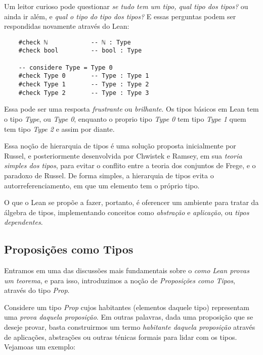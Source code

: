 Um leitor curioso pode questionar \textit{se tudo tem um tipo, qual tipo dos tipos?} ou ainda ir além, e \textit{qual o tipo do tipo dos tipos?} E essas perguntas podem ser respondidas novamente através do Lean:

\vspace{5mm}
\begin{lstlisting}
    #check ℕ            -- ℕ : Type
    #check bool         -- bool : Type

    -- considere Type = Type 0
    #check Type 0       -- Type : Type 1
    #check Type 1       -- Type : Type 2
    #check Type 2       -- Type : Type 3
\end{lstlisting}
\vspace{5mm}

\noindent Essa pode ser uma resposta \textit{frustrante} ou \textit{brilhante}.
Os tipos básicos em Lean tem o tipo \textit{Type}, ou \textit{Type 0}, enquanto o proprio tipo \textit{Type 0} tem tipo \textit{Type 1} quem tem tipo \textit{Type 2} e assim por diante.

Essa noção de hierarquia de tipos é uma solução proposta inicialmente por Russel, e posteriormente desenvolvida por Chwistek e Ramsey, em sua \textit{teoria simples dos tipos}, para evitar o conflito entre a teoria dos conjuntos de Frege, e o paradoxo de Russel.
De forma simples, a hierarquia de tipos evita o autorreferenciamento, em que um elemento tem o próprio tipo.

O que o Lean se propõe a fazer, portanto, é oferencer um ambiente para tratar da álgebra de tipos, implementando conceitos como \textit{abstração} e \textit{aplicação}, ou \textit{tipos dependentes}.

\subsection{Proposições como Tipos}
Entramos em uma das discussões mais fundamentais sobre o \textit{como Lean provas um teorema}, e para isso, introduzimos a noção de \textit{Proposições como Tipos}, através do tipo \textit{Prop}.

Considere um tipo \textit{Prop} cujos habitantes (elementos daquele tipo) representam uma \textit{prova daquela proposição}.
Em outras palavras, dada uma proposição que se deseje provar, basta construirmos um termo \textit{habitante daquela proposição} através de aplicações, abstrações ou outras ténicas formais para lidar com os tipos.
Vejamoas um exemplo:

